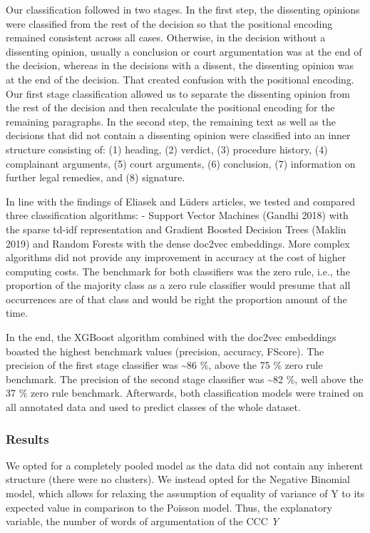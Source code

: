 \documentclass[
  11pt,
]{article}
\begin{document}
Our classification followed in two stages. In the first step, the
dissenting opinions were classified from the rest of the decision so
that the positional encoding remained consistent across all cases.
Otherwise, in the decision without a dissenting opinion, usually a
conclusion or court argumentation was at the end of the decision,
whereas in the decisions with a dissent, the dissenting opinion was at
the end of the decision. That created confusion with the positional
encoding. Our first stage classification allowed us to separate the
dissenting opinion from the rest of the decision and then recalculate
the positional encoding for the remaining paragraphs. In the second
step, the remaining text as well as the decisions that did not contain a
dissenting opinion were classified into an inner structure consisting
of: (1) heading, (2) verdict, (3) procedure history, (4) complainant
arguments, (5) court arguments, (6) conclusion, (7) information on
further legal remedies, and (8) signature.

In line with the findings of Eliasek and Lüders articles, we tested and
compared three classification algorithms: - Support Vector Machines
(Gandhi 2018) with the sparse td-idf representation and Gradient Boosted
Decision Trees (Maklin 2019) and Random Forests with the dense doc2vec
embeddings. More complex algorithms did not provide any improvement in
accuracy at the cost of higher computing costs. The benchmark for both
classifiers was the zero rule, i.e., the proportion of the majority
class as a zero rule classifier would presume that all occurrences are
of that class and would be right the proportion amount of the time.

In the end, the XGBoost algorithm combined with the doc2vec embeddings
boasted the highest benchmark values (precision, accuracy, FScore). The
precision of the first stage classifier was \textasciitilde86 \%, above
the 75 \% zero rule benchmark. The precision of the second stage
classifier was \textasciitilde82 \%, well above the 37 \% zero rule
benchmark. Afterwards, both classification models were trained on all
annotated data and used to predict classes of the whole dataset.

\hypertarget{results}{%
\subsubsection{Results}\label{results}}

We opted for a completely pooled model as the data did not contain any
inherent structure (there were no clusters). We instead opted for the
Negative Binomial model, which allows for relaxing the assumption of
equality of variance of Y to its expected value in comparison to the
Poisson model. Thus, the explanatory variable, the number of words of
argumentation of the CCC \emph{Y}
\end{document}
